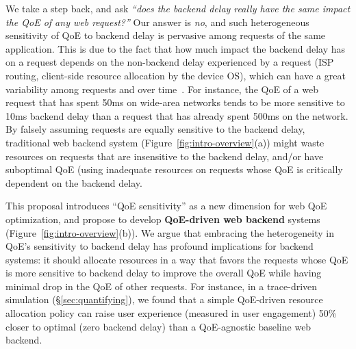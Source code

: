 We take a step back, and ask {\em ``does the backend delay really have the same impact the QoE of any web request?''}
Our answer is {\em no}, and such heterogeneous sensitivity of QoE to backend delay is pervasive among requests of the same application. 
This is due to the fact that how much impact the backend delay has on a request depends on the non-backend delay experienced by a request (\eg ISP routing, client-side resource allocation by the device OS), which can have a great variability among requests and over time~\cite{timecard,dqbarge}.
For instance, the QoE of a web request that has spent 50ms on wide-area networks tends to be more sensitive to 10ms backend delay than a request that has already spent 500ms on the network.
By falsely assuming requests are equally sensitive to the backend delay, traditional web backend system (Figure~\ref{fig:intro-overview}(a)) might waste resources on requests that are insensitive to the backend delay, and/or have suboptimal QoE (\eg using inadequate resources on requests whose QoE is critically dependent on the backend delay. 

This proposal introduces ``QoE sensitivity'' as a new dimension for web QoE optimization, and propose to develop {\bf QoE-driven web backend} systems (Figure~\ref{fig:intro-overview}(b)). 
We argue that embracing the heterogeneity in QoE's sensitivity to backend delay has profound implications for backend systems: 
it should allocate resources in a way that favors the requests whose QoE is more sensitive to backend delay to improve the overall QoE while having minimal drop in the QoE of other requests.
For instance, in a trace-driven simulation (\S\ref{sec:quantifying}), we found that a simple QoE-driven resource allocation policy can raise user experience (measured in user engagement) 50\% closer to optimal (\ie zero backend delay) than a QoE-agnostic baseline web backend.

